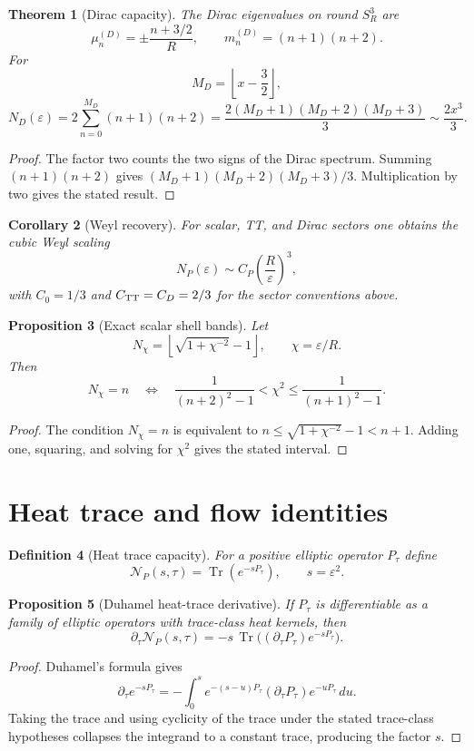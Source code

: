 \documentclass[11pt,a4paper]{article}
\newtheorem{theorem}{Theorem}[section]
\newtheorem{proposition}[theorem]{Proposition}
\newtheorem{corollary}[theorem]{Corollary}
\newtheorem{definition}[theorem]{Definition}
\newcommand{\Tr}{\operatorname{Tr}}
\begin{document}
\begin{theorem}[Dirac capacity]
The Dirac eigenvalues on round $S^3_R$ are
\[
\mu_n^{(D)}=\pm\frac{n+3/2}{R},
\qquad m_n^{(D)}=(n+1)(n+2).
\]
For
\[
M_D=\left\lfloor x-\frac32\right\rfloor,
\]
\[
N_D(\varepsilon)=2\sum_{n=0}^{M_D}(n+1)(n+2)
=\frac{2(M_D+1)(M_D+2)(M_D+3)}{3}
\sim\frac{2x^3}{3}.
\]
\end{theorem}
\begin{proof}
The factor two counts the two signs of the Dirac spectrum.  Summing $(n+1)(n+2)$ gives $(M_D+1)(M_D+2)(M_D+3)/3$.  Multiplication by two gives the stated result.\end{proof}

\begin{corollary}[Weyl recovery]
For scalar, TT, and Dirac sectors one obtains the cubic Weyl scaling~\cite{Weyl1911}
\[
N_P(\varepsilon)\sim C_P\left(\frac{R}{\varepsilon}\right)^3,
\]
with $C_0=1/3$ and $C_{\rm TT}=C_D=2/3$ for the sector conventions above.
\end{corollary}

\begin{proposition}[Exact scalar shell bands]
Let
\[
N_\chi=\left\lfloor\sqrt{1+\chi^{-2}}-1\right\rfloor,
\qquad \chi=\varepsilon/R.
\]
Then
\[
N_\chi=n\quad\Longleftrightarrow\quad
\frac{1}{(n+2)^2-1}<\chi^2\le\frac{1}{(n+1)^2-1}.
\]
\end{proposition}
\begin{proof}
The condition $N_\chi=n$ is equivalent to
$n\le\sqrt{1+\chi^{-2}}-1<n+1$.  Adding one, squaring, and solving for $\chi^2$ gives the stated interval.\end{proof}

\section{Heat trace and flow identities}

\begin{definition}[Heat trace capacity]
For a positive elliptic operator $P_\tau$ define
\[
\mathcal N_P(s,\tau)=\Tr(e^{-sP_\tau}),
\qquad s=\varepsilon^2.
\]
\end{definition}

\begin{proposition}[Duhamel heat-trace derivative]
If $P_\tau$ is differentiable as a family of elliptic operators with trace-class heat kernels, then
\[
\partial_\tau\mathcal N_P(s,\tau)
=-s\,\Tr\bigl((\partial_\tau P_\tau)e^{-sP_\tau}\bigr).
\]
\end{proposition}
\begin{proof}
Duhamel's formula gives
\[
\partial_\tau e^{-sP_\tau}=-\int_0^s e^{-(s-u)P_\tau}(\partial_\tau P_\tau)e^{-uP_\tau}\,du.
\]
Taking the trace and using cyclicity of the trace under the stated trace-class hypotheses collapses the integrand to a constant trace, producing the factor $s$.\end{proof}
\end{document}
